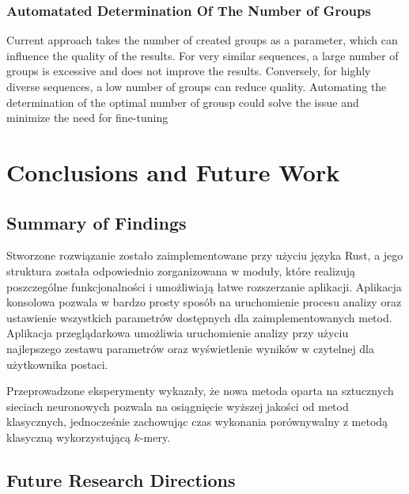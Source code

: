 \documentclass{article}
\newcommand{\temporary}[1]{
    \begin{tcolorbox}[colframe=red, colback=white, title={\textbf{WERSJA PO POLSKU}}, sharp corners=south]
        #1
    \end{tcolorbox}
}
\begin{document}
            \subsubsection{Automatated Determination Of The Number of Groups}

                Current approach takes the number of created groups as a parameter, which can influence the quality of the results. For very similar sequences, a large number of groups is excessive and does not improve the results. Conversely, for highly diverse sequences, a low number of groups can reduce quality. Automating the determination of the optimal number of grousp could solve the issue and minimize the need for fine-tuning 

    \clearpage
    \section{Conclusions and Future Work}

        \subsection{Summary of Findings}

            \temporary{
                Stworzone rozwiązanie zostało zaimplementowane przy użyciu języka Rust, a jego struktura została odpowiednio zorganizowana w moduły, które realizują poszczególne funkcjonalności i umożliwiają łatwe rozszerzanie aplikacji. Aplikacja konsolowa pozwala w bardzo prosty sposób na uruchomienie procesu analizy oraz ustawienie wszystkich parametrów dostępnych dla zaimplementowanych metod. Aplikacja przeglądarkowa umożliwia uruchomienie analizy przy użyciu najlepszego zestawu parametrów oraz wyświetlenie wyników w czytelnej dla użytkownika postaci.

                Przeprowadzone eksperymenty wykazały, że nowa metoda oparta na sztucznych sieciach neuronowych pozwala na osiągnięcie wyższej jakości od metod klasycznych, jednocześnie zachowując czas wykonania porównywalny z metodą klasyczną wykorzystującą $k$-mery.
            }

        \subsection{Future Research Directions}
\end{document}
